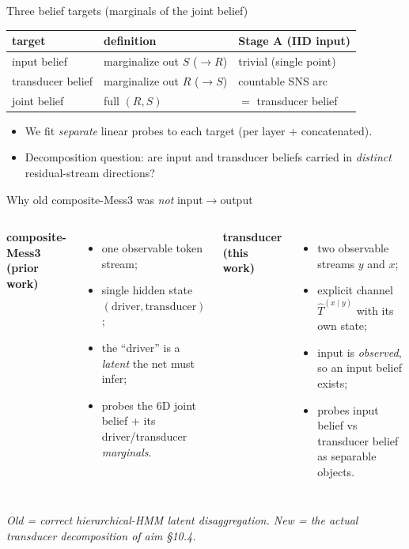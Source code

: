 \documentclass[aspectratio=169]{beamer}
\newcommand{\Ttr}{\hat{T}^{(x\mid y)}}
\begin{document}
\begin{frame}{Three belief targets (marginals of the joint belief)}
\centering
\begin{tabular}{lll}
\toprule
target & definition & Stage A (IID input) \\
\midrule
input belief & marginalize out $S$ ($\to R$) & trivial (single point) \\
transducer belief & marginalize out $R$ ($\to S$) & countable SNS arc \\
joint belief & full $(R,S)$ & $=$ transducer belief \\
\bottomrule
\end{tabular}
\vspace{4mm}
\begin{itemize}
  \item We fit \emph{separate} linear probes to each target (per layer + concatenated).
  \item Decomposition question: are input and transducer beliefs carried in \emph{distinct}
        residual-stream directions?
\end{itemize}
\end{frame}

\begin{frame}{Why old composite-Mess3 was \emph{not} input$\to$output}
\begin{columns}[T]
\textbf{composite-Mess3 (prior work)}
\begin{itemize}
  \item one observable token stream;
  \item single hidden state $(\text{driver},\text{transducer})$;
  \item the ``driver'' is a \emph{latent} the net must infer;
  \item probes the 6D joint belief + its driver/transducer \emph{marginals}.
\end{itemize}
\textbf{transducer (this work)}
\begin{itemize}
  \item two observable streams $y$ and $x$;
  \item explicit channel $\Ttr$ with its own state;
  \item input is \emph{observed}, so an input belief exists;
  \item probes input belief vs transducer belief as separable objects.
\end{itemize}
\end{columns}
\vspace{3mm}
\centering
\emph{Old = correct hierarchical-HMM latent disaggregation. New = the actual transducer
decomposition of aim §10.4.}
\end{frame}
\end{document}
